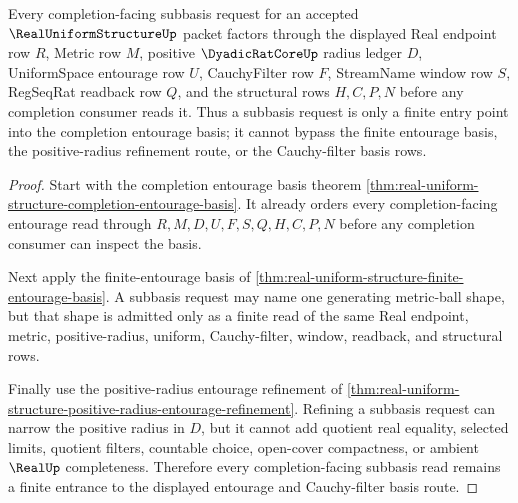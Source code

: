 \begin{theorem}
\label{thm:real-uniform-structure-completion-entourage-subbasis}
Every completion-facing subbasis request for an accepted $\RealUniformStructureUp$ packet factors through the displayed Real endpoint row $R$, Metric row $M$, positive $\DyadicRatCoreUp$ radius ledger $D$, UniformSpace entourage row $U$, CauchyFilter row $F$, StreamName window row $S$, RegSeqRat readback row $Q$, and the structural rows $H,C,P,N$ before any completion consumer reads it. Thus a subbasis request is only a finite entry point into the completion entourage basis; it cannot bypass the finite entourage basis, the positive-radius refinement route, or the Cauchy-filter basis rows.
\end{theorem}
\begin{proof}
Start with the completion entourage basis theorem \autoref{thm:real-uniform-structure-completion-entourage-basis}. It already orders every completion-facing entourage read through $R,M,D,U,F,S,Q,H,C,P,N$ before any completion consumer can inspect the basis.

Next apply the finite-entourage basis of \autoref{thm:real-uniform-structure-finite-entourage-basis}. A subbasis request may name one generating metric-ball shape, but that shape is admitted only as a finite read of the same Real endpoint, metric, positive-radius, uniform, Cauchy-filter, window, readback, and structural rows.

Finally use the positive-radius entourage refinement of \autoref{thm:real-uniform-structure-positive-radius-entourage-refinement}. Refining a subbasis request can narrow the positive radius in $D$, but it cannot add quotient real equality, selected limits, quotient filters, countable choice, open-cover compactness, or ambient $\RealUp$ completeness. Therefore every completion-facing subbasis read remains a finite entrance to the displayed entourage and Cauchy-filter basis route.
\end{proof}

